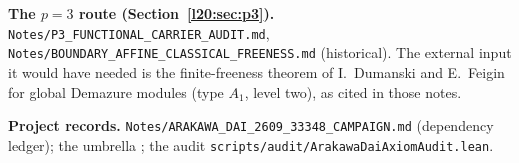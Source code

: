 \textbf{The $p=3$ route (Section~\ref{l20:sec:p3}).} \texttt{Notes/P3\_FUNCTIONAL\_CARRIER\_AUDIT.md},
\texttt{Notes/BOUNDARY\_AFFINE\_CLASSICAL\_FREENESS.md} (historical). The external input it would have needed is the finite-freeness
theorem of I.~Dumanski and E.~Feigin for global Demazure modules (type $A_1$, level two), as cited in those notes.

\textbf{Project records.} \texttt{Notes/ARAKAWA\_DAI\_2609\_33348\_CAMPAIGN.md} (dependency ledger); the umbrella
; the audit \texttt{scripts/audit/ArakawaDaiAxiomAudit.lean}.

\endgroup
